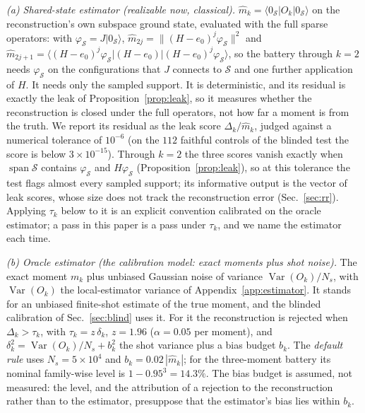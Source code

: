 \documentclass[submission, PhysCore]{SciPost}
\begin{document}
\emph{(a) Shared-state estimator (realizable now, classical).} $\widehat m_k=\langle 0_\mathcal S|O_k|0_\mathcal S\rangle$ on the reconstruction's own subspace ground state, evaluated with the full sparse operators: with $\varphi_\mathcal S=J|0_\mathcal S\rangle$, $\widehat m_{2j}=\|(H-e_0)^j\varphi_\mathcal S\|^2$ and $\widehat m_{2j+1}=\langle(H-e_0)^j\varphi_\mathcal S|(H-e_0)|(H-e_0)^j\varphi_\mathcal S\rangle$, so the battery through $k=2$ needs $\varphi_\mathcal S$ on the configurations that $J$ connects to $\mathcal S$ and one further application of $H$. It needs only the sampled support. It is deterministic, and its residual is exactly the leak of Proposition~\ref{prop:leak}, so it measures whether the reconstruction is closed under the full operators, not how far a moment is from the truth. We report its residual as the leak score $\Delta_k/\widehat m_k$, judged against a numerical tolerance of $10^{-6}$ (on the $112$ faithful controls of the blinded test the score is below $3\times10^{-15}$). Through $k=2$ the three scores vanish exactly when $\operatorname{span}\mathcal S$ contains $\varphi_\mathcal S$ and $H\varphi_\mathcal S$ (Proposition~\ref{prop:leak}), so at this tolerance the test flags almost every sampled support; its informative output is the vector of leak scores, whose size does not track the reconstruction error (Sec.~\ref{sec:rr}). Applying $\tau_k$ below to it is an explicit convention calibrated on the oracle estimator; a pass in this paper is a pass under $\tau_k$, and we name the estimator each time.

\emph{(b) Oracle estimator (the calibration model: exact moments plus shot noise).} The exact moment $m_k$ plus unbiased Gaussian noise of variance $\operatorname{Var}(O_k)/N_s$, with $\operatorname{Var}(O_k)$ the local-estimator variance of Appendix~\ref{app:estimator}. It stands for an unbiased finite-shot estimate of the true moment, and the blinded calibration of Sec.~\ref{sec:blind} uses it. For it the reconstruction is rejected when $\Delta_k>\tau_k$, with $\tau_k=z\,\delta_k$, $z=1.96$ ($\alpha=0.05$ per moment), and $\delta_k^2=\operatorname{Var}(O_k)/N_s+b_k^2$ the shot variance plus a bias budget $b_k$. The \emph{default rule} uses $N_s=5\times10^4$ and $b_k=0.02\,|\widehat m_k|$; for the three-moment battery its nominal family-wise level is $1-0.95^3=14.3\%$. The bias budget is assumed, not measured: the level, and the attribution of a rejection to the reconstruction rather than to the estimator, presuppose that the estimator's bias lies within $b_k$.
\end{document}
